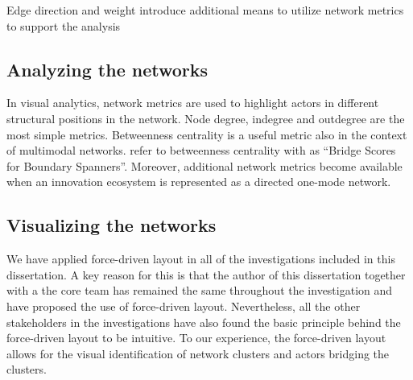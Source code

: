 


 {Edge direction and weight introduce additional means to utilize network metrics to support the analysis}

\subsection{Analyzing the networks}

In visual analytics, network metrics are used to highlight actors in different structural positions in the network. Node degree, indegree and outdegree are the most simple metrics. Betweenness centrality is a useful metric also in the context of multimodal networks. \cite{Hansen2011AnalyzingWorld} refer to betweenness centrality with as ``Bridge Scores for Boundary Spanners''. Moreover, additional network metrics become available when an innovation ecosystem is represented as a directed one-mode network. 





\subsection{Visualizing the networks}

We have applied force-driven layout in all of the investigations included in this dissertation. A key reason for this is that the author of this dissertation together with a the core team has remained the same throughout the investigation and have proposed the use of force-driven layout. Nevertheless, all the other stakeholders in the investigations have also found the basic principle behind the force-driven layout to be intuitive. To our experience, the force-driven layout allows for the visual identification of network clusters and actors bridging the clusters.

